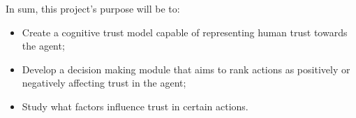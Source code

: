 
In sum, this project's purpose will be to:
\begin{itemize}
	\item Create a cognitive trust model capable of representing human trust towards the agent;
	\item Develop a decision making module that aims to rank actions as positively or negatively affecting trust in the agent;
	\item Study what factors influence trust in certain actions.
\end{itemize}





